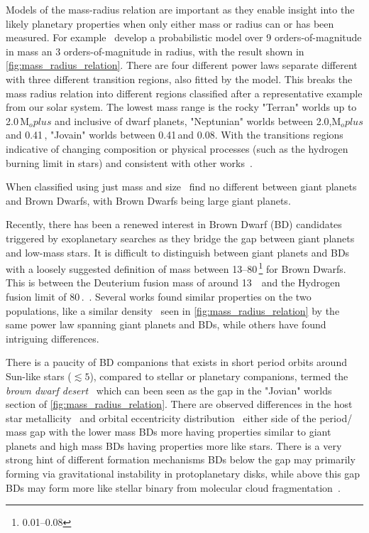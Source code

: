 Models of the mass-radius relation are important as they enable insight into the likely planetary properties when only either mass or radius can or has been measured.
For example~\citet{chen_probabilistic_2016} develop a probabilistic model over 9 orders-of-magnitude in mass an 3 orders-of-magnitude in radius, with the result shown in \cref{fig:mass_radius_relation}.
There are four different power laws separate different with three different transition regions, also fitted by the model.
This breaks the mass radius relation into different regions classified after a representative example from our solar system.
The lowest mass range is the rocky "Terran" worlds up to 2.0\,\(\textrm{M}_oplus\) and inclusive of dwarf planets, "Neptunian" worlds between 2.0,\(\textrm{M}_oplus\) and 0.41\,\Mjup, "Jovain" worlds between 0.41\,\Mjup and 0.08\Msun.
With the transitions regions indicative of changing composition or physical processes (such as the hydrogen burning limit in stars) and consistent with other works~\citep[e.g.][]{weiss_mass_2013, dieterich_solar_2014, hatzes_definition_2015, rogers_most_2015}.

When classified using just mass and size~\citet{chen_probabilistic_2016} find no different between giant planets and Brown Dwarfs, with Brown Dwarfs being large giant planets.

Recently, there has been a renewed interest in Brown Dwarf (BD) candidates triggered by exoplanetary searches as they bridge the gap between giant planets and low-mass stars.
It is difficult to distinguish between giant planets and BDs with a loosely suggested definition of mass between 13--80\,\Mjup\footnote{0.01--0.08\Msun} for Brown Dwarfs.
This is between the Deuterium fusion mass of around 13\,\Mjup~\citep[e.g.][]{spiegel_deuteriumburning_2011} and the Hydrogen fusion limit of 80\,\Mjup.~\citep{chabrier_theory_2000, dieterich_solar_2014}.
Several works found similar properties on the two populations, like a similar density~\citep{hatzes_definition_2015, chen_probabilistic_2016} seen in \cref{fig:mass_radius_relation} by the same power law spanning giant planets and BDs, while others have found intriguing differences.

There is a paucity of BD companions that exists in short period orbits around Sun-like stars (\(\lesssim5 \)\AU), compared to stellar or planetary companions, termed the \emph{brown dwarf desert}~\citep{halbwachs_exploring_2000, zucker_analysis_2001, sahlmann_search_2011, ranc_moa2007blg197_2015} which can been seen as the gap in the "Jovian" worlds section of \cref{fig:mass_radius_relation}.
There are observed differences in the host star metallicity~\citep{maldonado_searching_2017, santos_observational_2017, schlaufman_evidence_2018} and orbital eccentricity distribution~\citep{ma_statistical_2014} either side of the period/ mass gap with the lower mass BDs more having properties similar to giant planets and high mass BDs having properties more like stars.
There is a very strong hint of different formation mechanisms BDs below the gap may primarily forming via gravitational instability in protoplanetary disks, while above this gap BDs may form more like stellar binary from molecular cloud fragmentation~\citep{ma_statistical_2014}.

